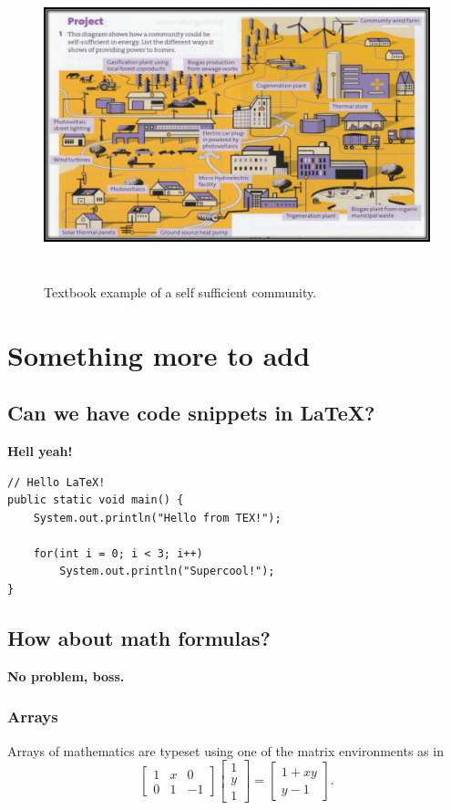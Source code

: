 \documentclass[11pt, titlepage]{article}
\begin{document}
			\begin{figure}[!h]
				\begin{center}
					\includegraphics[height=9cm]{img/textbook.png}
					\caption{Textbook example of a self sufficient community.}
				\end{center}
			\end{figure}

			\pagebreak

\section{Something more to add}
	\subsection{Can we have code snippets in \LaTeX?}
		\textbf{Hell yeah!}

		\begin{lstlisting}
// Hello LaTeX!
public static void main() {
	System.out.println("Hello from TEX!");
	
	for(int i = 0; i < 3; i++) 
		System.out.println("Supercool!");
}
		\end{lstlisting}

	\subsection{How about math formulas?}
		\textbf{No problem, boss.}
			\subsubsection{Arrays}
				Arrays of mathematics are typeset using one of the matrix environments as in
				\[
					\begin{bmatrix}
						1 & x & 0 \\
						0 & 1 & -1
					\end{bmatrix}\begin{bmatrix}
						1  \\
						y  \\
						1
					\end{bmatrix}
					=\begin{bmatrix}
						1+xy  \\
						y-1
					\end{bmatrix}.
				\]
\end{document}
